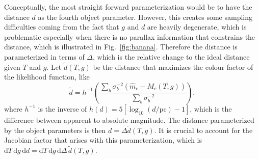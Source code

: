 \documentclass[fleqn,usenatbib]{mnras}
\newcommand{\Teff}{T}
\newcommand{\logg}{g}
\newcommand{\de}{\text{d}}
\begin{document}
Conceptually, the most straight forward parameterization would be to have the distance $d$ as the fourth object parameter. However, this creates some sampling difficulties coming from the fact that $\logg$ and $d$ are heavily degenerate, which is problematic especially when there is no parallax information that constrains the distance, which is illustrated in Fig.~\ref{fig:banana}. Therefore the distance is parameterized in terms of $\Delta$, which is the relative change to the ideal distance given $\Teff$ and $\logg$. Let $\tilde{d}(\Teff,\logg)$ be the distance that maximizes the colour factor of the likelihood function, like
\begin{equation}
	\tilde{d} = 
    h^{-1}\left( \frac{\sum_b \sigma_b^{-2} (\hat{m}_c-M_c(\Teff,\logg))}{\sum_b \sigma_b^{-2}} \right),
\end{equation}
where $h^{-1}$ is the inverse of $h(d)=5[\log_{10}(d/\text{pc})-1]$, which is the difference between apparent to absolute magnitude. The distance parameterized by the object parameters is then $d=\Delta\tilde{d}(\Teff,\logg)$. It is crucial to account for the Jacobian factor that arises with this parameterization, which is $\de \Teff\, \de \logg\, \de d = \de \Teff\, \de \logg\, \de \Delta\, \tilde{d}(\Teff,\logg)$.
\end{document}
